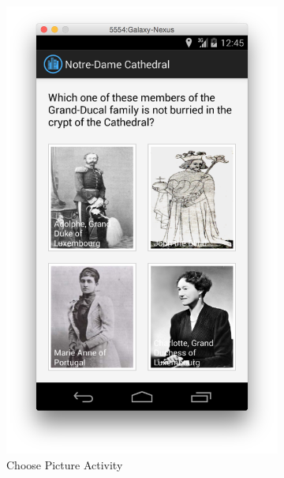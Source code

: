 \begin{figure}[H]
\begin{subfigure}[b]{0.3\textwidth}
                \includegraphics[width=\textwidth]{Figures/ChoosePictureActivity}
                \caption{Choose Picture Activity}
        \end{subfigure}
	\begin{subfigure}[b]{0.3\textwidth}

\end{subfigure}
\end{figure}
